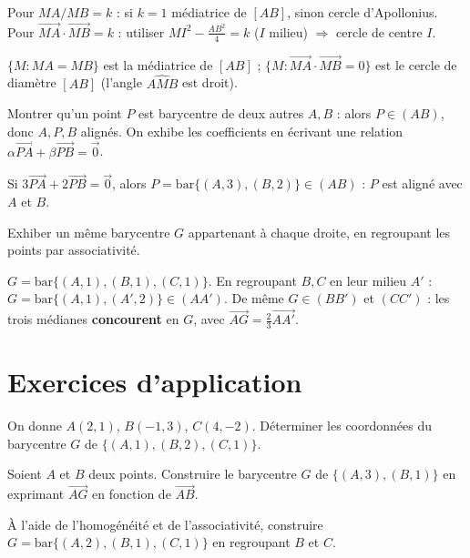 Pour $MA/MB=k$ : si $k=1$ médiatrice de $[AB]$, sinon cercle d'Apollonius. Pour $\overrightarrow{MA}\cdot\overrightarrow{MB}=k$ : utiliser $MI^2-\frac{AB^2}{4}=k$ ($I$ milieu) $\Rightarrow$ cercle de centre $I$.
\begin{exemple}
$\{M:MA=MB\}$ est la médiatrice de $[AB]$ ; $\{M:\overrightarrow{MA}\cdot\overrightarrow{MB}=0\}$ est le cercle de diamètre $[AB]$ (l'angle $\widehat{AMB}$ est droit).
\end{exemple}

Montrer qu'un point $P$ est barycentre de deux autres $A,B$ : alors $P\in(AB)$, donc $A,P,B$ alignés. On exhibe les coefficients en écrivant une relation $\alpha\overrightarrow{PA}+\beta\overrightarrow{PB}=\vec0$.
\begin{exemple}
Si $3\overrightarrow{PA}+2\overrightarrow{PB}=\vec0$, alors $P=\mathrm{bar}\{(A,3),(B,2)\}\in(AB)$ : $P$ est aligné avec $A$ et $B$.
\end{exemple}

Exhiber un même barycentre $G$ appartenant à chaque droite, en regroupant les points par associativité.
\begin{exemple}
$G=\mathrm{bar}\{(A,1),(B,1),(C,1)\}$. En regroupant $B,C$ en leur milieu $A'$ : $G=\mathrm{bar}\{(A,1),(A',2)\}\in(AA')$. De même $G\in(BB')$ et $(CC')$ : les trois médianes \textbf{concourent} en $G$, avec $\overrightarrow{AG}=\frac23\overrightarrow{AA'}$.
\end{exemple}

\section{Exercices d'application}

\exo{} On donne $A(2,1)$, $B(-1,3)$, $C(4,-2)$. Déterminer les coordonnées du barycentre $G$ de $\{(A,1),(B,2),(C,1)\}$.

\exo{} Soient $A$ et $B$ deux points. Construire le barycentre $G$ de $\{(A,3),(B,1)\}$ en exprimant $\overrightarrow{AG}$ en fonction de $\overrightarrow{AB}$.

\exo{} À l'aide de l'homogénéité et de l'associativité, construire $G=\mathrm{bar}\{(A,2),(B,1),(C,1)\}$ en regroupant $B$ et $C$.

